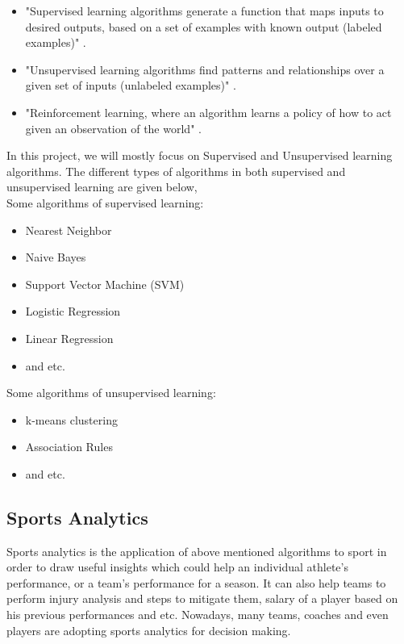 \documentclass[format=sigconf]{acmart}
\begin{document}
\begin{itemize}
    \item "Supervised learning algorithms generate a function that maps inputs to desired outputs, based
    on a set of examples with known output (labeled examples)" \cite{tzanis2009machine}.
    \item "Unsupervised learning algorithms find patterns and relationships over a given set of inputs 
    (unlabeled examples)" \cite{tzanis2009machine}.
    \item "Reinforcement learning, where an algorithm learns a policy of how to act given an observation of the world" \cite{tzanis2009machine}.
\end{itemize}
In this project, we will mostly focus on Supervised and Unsupervised learning algorithms. The different types of algorithms in both
supervised and unsupervised learning are given below, \\

Some algorithms of supervised learning:
\begin{itemize}
    \item Nearest Neighbor
    \item Naive Bayes
    \item Support Vector Machine (SVM)
    \item Logistic Regression
    \item Linear Regression
    \item and etc.
\end{itemize}
\par
Some algorithms of unsupervised learning:
\begin{itemize}
    \item k-means clustering
    \item Association Rules \cite{typeofml}
    \item and etc.
\end{itemize}
\subsection{Sports Analytics}
Sports analytics is the application of above mentioned algorithms to sport in order to draw useful insights which could help 
an individual athlete's performance, or a team's performance for a season. It can also help teams to perform injury analysis
and steps to mitigate them, salary of a player based on his previous performances and etc. Nowadays,  many teams, coaches and 
even players are adopting sports analytics for decision making.
\end{document}
